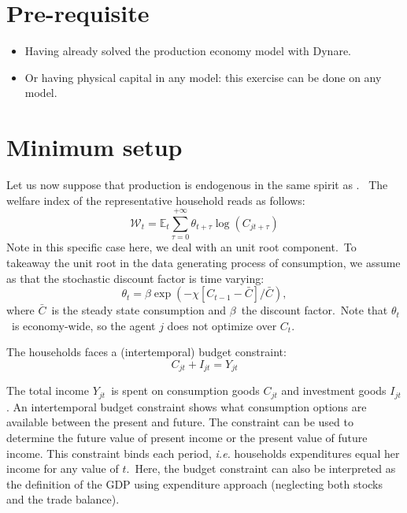 \documentclass[a4paper,12pt]{article}%
\begin{document}
\FRONTPAGE


\section{Pre-requisite}

\begin{itemize}
\item Having already solved the production economy model with Dynare.

\item Or having physical capital in any model: this exercise can be done on
any model.
\end{itemize}

\section{Minimum setup}

Let us now suppose that production is endogenous in the same spirit as
\cite{kydland1982time}. \ The welfare index of the representative household
reads as follows:%
\begin{equation}
\mathcal{W}_{t}=\mathbb{E}_{t}\sum_{\tau=0}^{+\infty}\theta_{t+\tau}%
\log\left(  C_{jt+\tau}\right)
\end{equation}
Note in this specific case here, we deal with an unit root component.\ To
takeaway the unit root in the data generating process of consumption, we
assume as \cite{schmitt2003closing} that the stochastic discount factor is
time varying:%
\begin{equation}
\theta_{t}=\beta\exp(-\chi\left[  C_{t-1}-\bar{C}\right]  /\bar{C}),
\end{equation}
where $\bar{C}$\ is the steady state consumption and $\beta$\ the discount
factor.\ Note that $\theta_{t}$\ is economy-wide, so the agent $j$ does not
optimize over $C_{t}$.

The households faces a (intertemporal) budget constraint:%
\begin{equation}
C_{jt}+I_{jt}=Y_{jt} \label{eq hh budget constraint}%
\end{equation}


The total income $Y_{jt}$\ is spent on consumption goods $C_{jt}$ and
investment goods $I_{jt}$. An intertemporal budget constraint shows what
consumption options are available between the present and future. The
constraint can be used to determine the future value of present income or the
present value of future income. This constraint binds each period,
\textit{i.e.} households expenditures equal her income for any value of
$t$.\ Here, the budget constraint can also be interpreted as the definition of
the GDP using expenditure approach (neglecting both stocks and the trade balance).
\end{document}
